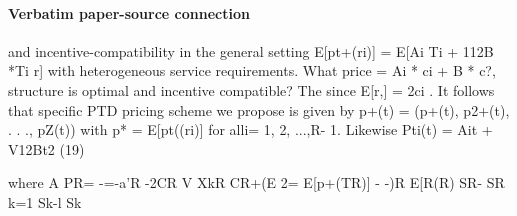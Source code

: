 \documentclass[10pt]{article}
\begin{document}
\paragraph{Verbatim paper-source connection}
\begin{ReviewVerbatim}
and incentive-compatibility in the general setting                   E[pt+(ri)] = E[Ai Ti + 112B *Ti r]
with heterogeneous service requirements. What price                                 = Ai * ci + B * c?,
structure is optimal and incentive compatible? The
                                                                    since E[r,] = 2ci . It follows that
specific PTD pricing scheme we propose is given by
p+(t) = (p+(t), p2+(t), . . ., pZ(t)) with                          p* = E[pt((ri)] for alli= 1, 2, ...,R- 1.
                                                                    Likewise
Pti(t) = Ait + V12Bt2 (19)

where                                                                A
                                                                     PR= -=-a'R
                                                                              -2CR V XkR
                                                                                 CR+(E    2= E[p+(TR)]
                                                                                       - -)R E[R(R)
                                                                           SR- SR k=1 Sk-l Sk


\end{ReviewVerbatim}
\end{document}
